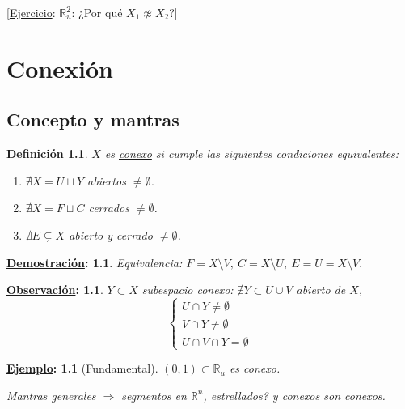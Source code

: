 \documentclass[10pt,a4paper,openright]{book}
\theoremstyle{break}
\newtheorem*{defi}{Definición}
\newtheorem*{demo}{\underline{Demostración}:}
\newtheorem*{obs}{\underline{Observación}:}
\newtheorem*{ej}{\underline{Ejemplo}:}
\begin{document}
[\underline{Ejercicio}: $\mathbb{R}_u^2$: ¿Por qué $X_1 \not \approx X_2$?]

\chapter{Conexión}%
\label{cha:conexion}
\section{Concepto y mantras}%
\label{sec:concepto_y_mantras_conx}
\begin{defi}
$X$ es \underline{conexo} si cumple las siguientes condiciones equivalentes:
\begin{enumerate}
    \item $\nexists X = U \sqcup Y$ abiertos $\neq \emptyset$.
    \item $\nexists X = F \sqcup C$ cerrados $\neq \emptyset$.
    \item $\nexists E \subsetneq X$ abierto y cerrado $\neq \emptyset$.
\end{enumerate}
\end{defi}
\begin{demo}
Equivalencia: $F = X \setminus V,\ C = X \setminus U,\ E = U = X \setminus V.$
\end{demo}

\begin{obs}
$Y \subset X$ subespacio conexo: $\nexists Y \subset U \cup V$ abierto de $X$, 
\[
\begin{cases}
    U \cap Y \neq \emptyset\\
    V \cap Y \neq \emptyset\\
    U \cap V \cap Y = \emptyset
\end{cases} 
\]
\end{obs}

\begin{ej}[Fundamental]
$\left( 0, 1 \right) \subset \mathbb{R}_u$ es conexo. 

Mantras generales $\Rightarrow$ segmentos en $\mathbb{R}^n$, estrellados? y conexos son conexos.
\end{ej}
\end{document}
